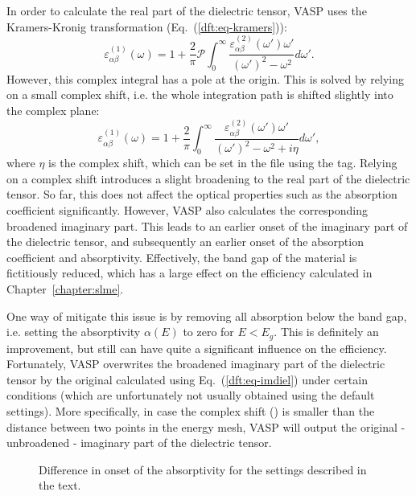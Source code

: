 \begin{refsection}
In order to calculate the real part of the dielectric tensor, VASP 
uses the Kramers-Kronig transformation (Eq.~(\ref{dft:eq-kramers})):
\begin{equation}
\varepsilon_{\alpha \beta}^{(1)} (\omega) = 1 + \frac{2}{\pi} \mathcal{P} 
\int_0^\infty \frac{\varepsilon_{\alpha \beta}^{(2)} 
(\omega')\omega'}{(\omega')^2 - \omega^2}d\omega'.
\end{equation} 
However, this complex integral has a pole at the origin. This is solved by 
relying on a small complex shift, i.e. the whole integration path is shifted 
slightly into the complex plane:
\begin{equation}
\varepsilon_{\alpha \beta}^{(1)} (\omega) = 1 + \frac{2}{\pi} 
\int_0^\infty \frac{\varepsilon_{\alpha \beta}^{(2)} 
(\omega')\omega'}{(\omega')^2 - \omega^2 + i\eta}d\omega', 
\end{equation} 
where $\eta$ is the complex shift, which can be set in the  
file using the   tag. Relying on a complex shift introduces 
a slight broadening to the real part of the dielectric tensor. So far, 
this does not affect the optical properties such as the absorption 
coefficient significantly. However, VASP also calculates 
the corresponding broadened imaginary part. This leads to an earlier onset of 
the imaginary part of the dielectric tensor, and subsequently an earlier onset 
of the absorption coefficient and absorptivity. Effectively, the band gap of 
the material is fictitiously reduced, which has a large effect on the 
efficiency calculated in Chapter~\ref{chapter:slme}.

One way of mitigate this issue is by removing all absorption below the 
band gap, i.e. setting the absorptivity $\alpha(E)$ to zero for $E < E_g$. 
This is definitely an improvement, but still can have quite a significant 
influence on the efficiency. Fortunately, VASP overwrites the 
broadened imaginary part of the dielectric tensor by the original calculated 
using Eq.~(\ref{dft:eq-imdiel}) under certain conditions (which are 
unfortunately not usually obtained using the default settings).  More 
specifically, in case the complex shift () is smaller than 
the distance between two points in the energy mesh, VASP will 
output the original - unbroadened - imaginary part of the dielectric tensor.

\begin{wrapfigure}{r}{0.52\textwidth}
\vspace{-2em}
\centering

\caption{Difference in onset of the absorptivity for the settings described in 
the text.}
\label{appendix:fig-onset}
\end{wrapfigure}


\end{refsection}
